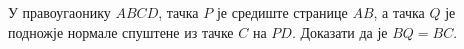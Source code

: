 \problem
У правоугаонику $ABCD$, тачка $P$ је средиште странице $AB$, а тачка $Q$ је
подножје нормале спуштене из тачке $C$ на $PD$.
Доказати да је $BQ = BC$.

\solution

\endproblem
